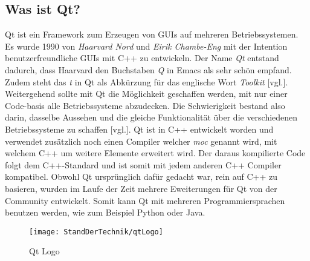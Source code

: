 \subsection{Was ist Qt?}
\label{subsec:WasIstQt}
Qt ist ein Framework zum Erzeugen von GUIs auf mehreren Betriebssystemen. Es wurde 1990 von
\emph{Haarvard Nord} und \emph{Eirik Chambe-Eng} mit der Intention benutzerfreundliche
GUIs mit C++ zu entwickeln. Der Name \emph{Qt}
entstand dadurch, dass Haarvard den Buchstaben \emph{Q} in Emacs als sehr schön empfand. Zudem
steht das \emph{t} in Qt als
Abkürzung für das englische Wort \emph{Toolkit} \cite{qtStory}[vgl.].
\newline
\newline
Weitergehend sollte mit Qt die Möglichkeit geschaffen werden, mit nur einer Code-basis alle
Betriebssysteme abzudecken. Die Schwierigkeit bestand also darin, dasselbe Aussehen
und die gleiche Funktionalität über die verschiedenen Betriebssysteme zu
schaffen \cite{GettingStartedQt}[vgl.].
\newline
\newline
Qt ist in C++ entwickelt worden und verwendet zusätzlich noch einen Compiler welcher
\emph{\ac{moc}} genannt wird, mit welchem C++ um weitere Elemente erweitert wird. Der daraus
kompilierte Code folgt dem C++-Standard und ist somit mit jedem anderen C++ Compiler kompatibel.
Obwohl Qt ursprünglich dafür gedacht war, rein auf C++ zu basieren, wurden im Laufe der Zeit
mehrere Eweiterungen für Qt von der Community entwickelt. Somit kann Qt mit mehreren
Programmiersprachen benutzen werden, wie zum Beispiel Python oder Java.
\begin{figure}[h]
    \centering
    \texttt{[image: StandDerTechnik/qtLogo]}
    \caption[Qt Logo]{Qt Logo}
    \label{img:qtLogo}
\end{figure}